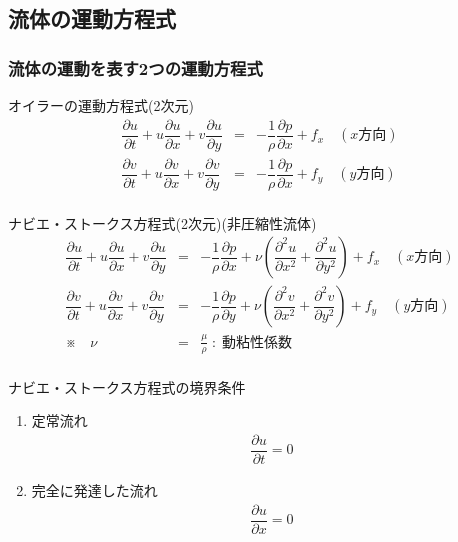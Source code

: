 \documentclass[a4paper]{jsarticle}
\begin{document}
\subsection{流体の運動方程式}
\subsubsection{流体の運動を表す2つの運動方程式}
\begin{itembox}[l]{オイラーの運動方程式(2次元)}
    \begin{eqnarray*}
        \dfrac{\partial u}{\partial t}+u\dfrac{\partial u}{\partial x}+v\dfrac{\partial u}{\partial y}&=&-\dfrac{1}{\rho}\dfrac{\partial p}{\partial x}+f_x\quad(x方向)\\
        \dfrac{\partial v}{\partial t}+u\dfrac{\partial v}{\partial x}+v\dfrac{\partial v}{\partial y}&=&-\dfrac{1}{\rho}\dfrac{\partial p}{\partial x}+f_y\quad(y方向)\\
    \end{eqnarray*}
\end{itembox}
\begin{itembox}[l]{ナビエ・ストークス方程式(2次元)\quad(非圧縮性流体)}
    \begin{eqnarray*}
        \dfrac{\partial u}{\partial t}+u\dfrac{\partial u}{\partial x}+v\dfrac{\partial u}{\partial y}&=&-\dfrac{1}{\rho}\dfrac{\partial p}{\partial x}+\nu\left(\dfrac{\partial^2 u}{\partial x^2}+\dfrac{\partial^2 u}{\partial y^2}\right)+f_x\quad(x方向)\\
        \dfrac{\partial v}{\partial t}+u\dfrac{\partial v}{\partial x}+v\dfrac{\partial v}{\partial y}&=&-\dfrac{1}{\rho}\dfrac{\partial p}{\partial y}+\nu\left(\dfrac{\partial^2 v}{\partial x^2}+\dfrac{\partial^2 v}{\partial y^2}\right)+f_y\quad(y方向)\\
        ※\quad \nu &=& \frac{\mu}{\rho} \;:\; 動粘性係数\\
    \end{eqnarray*}
\end{itembox}
\begin{itembox}[l]{ナビエ・ストークス方程式の境界条件}
    \begin{enumerate}
        \item 定常流れ
              \begin{eqnarray*}
                  \dfrac{\partial u}{\partial t}=0
              \end{eqnarray*}
        \item 完全に発達した流れ
              \begin{eqnarray*}
                  \dfrac{\partial u}{\partial x}=0
              \end{eqnarray*}
    \end{enumerate}
\end{itembox}
\end{document}
